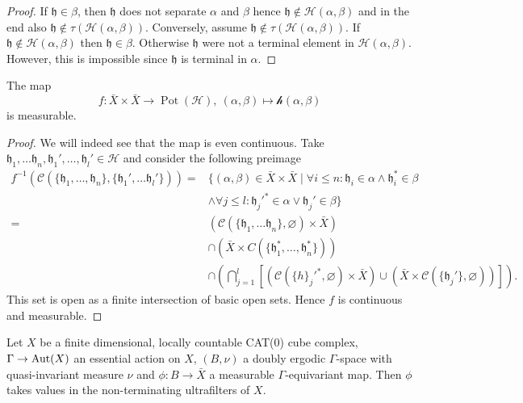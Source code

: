 \begin{proof}
  If \(\mathfrak{h} \in \beta\), then \(\mathfrak{h}\) does not separate \(\alpha\) and \(\beta\) hence \(\mathfrak{h} \notin \mathcal{H}(\alpha, \beta)\) and in the end also \(\mathfrak{h} \notin \tau(\mathcal{H}(\alpha, \beta))\). Conversely, assume \(\mathfrak{h} \notin \tau(\mathcal{H}(\alpha, \beta))\). If \(\mathfrak{h} \notin \mathcal{H}(\alpha, \beta)\) then \(\mathfrak{h} \in \beta\). Otherwise \(\mathfrak{h}\) were not a terminal element in \(\mathcal{H}(\alpha, \beta)\). However, this is impossible since \(\mathfrak{h}\) is terminal in \(\alpha\).
\end{proof}

\begin{lemma}
  The map
  \[
    f\colon \bar X \times \bar X \to \operatorname{Pot}(\mathcal{H}),\ (\alpha, \beta)\mapsto \mathcal{h}(\alpha, \beta)
  \]
  is measurable.
\end{lemma}

\begin{proof}
  We will indeed see that the map is even continuous. Take \(\mathfrak{h}_1,\dots \mathfrak{h}_n, \mathfrak{h}_1', \dots, \mathfrak{h}_l' \in \mathcal{H}\) and consider the following preimage
  \begin{align*}
    f^{-1}(\mathcal{C}(\{\mathfrak{h}_1, \dots, \mathfrak{h}_n\}, \{\mathfrak{h}_1', \dots \mathfrak{h}_l'\}))  = & \{(\alpha, \beta) \in \bar X \times \bar X \mid \forall i \leq n\colon \mathfrak{h}_i \in \alpha \wedge \mathfrak{h}_i^\ast \in \beta\\
    & \wedge \forall j \leq l \colon \mathfrak{h}_j'^\ast \in \alpha \vee \mathfrak{h}_j' \in \beta\}\\
    = & (\mathcal{C}(\{\mathfrak{h}_1, \dots \mathfrak{h}_n\}, \varnothing)  \times \bar X)\\
    & \cap (\bar X \times C(\{\mathfrak{h}_1^\ast, \dots, \mathfrak{h}_n^\ast\}))\\
                                                                                                                  & \cap \left ( \bigcap_{j=1}^l \left[(\mathcal{C}(\{h\}_j'^\ast, \varnothing) \times \bar X) \cup (\bar X \times \mathcal{C}(\{\mathfrak{h}_j'\}, \varnothing))\right]\right).
  \end{align*}
  This set is open as a finite intersection of basic open sets. Hence \(f\) is continuous and measurable.
\end{proof}

\begin{lemma}[{\cite[Lemma~4.11]{MR3509968}}]
  \label{lem:4.11}
  Let \(X\) be a finite dimensional, locally countable CAT(0) cube complex, \(\Gamma \to \operatorname{Aut}(X)\) an essential action on \(X\), \((B, \nu)\) a doubly ergodic \(\Gamma\)-space with quasi-invariant measure \(\nu\) and \(\phi\colon B \to \bar X\) a measurable \(\Gamma\)-equivariant map. Then \(\phi\) takes values in the non-terminating ultrafilters of \(X\).
\end{lemma}

